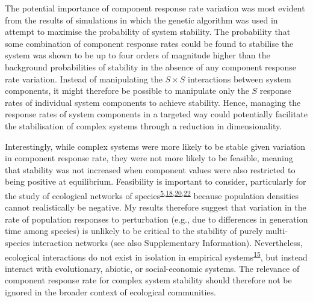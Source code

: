 \documentclass[]{article}
\begin{document}
The potential importance of component response rate variation was most
evident from the results of simulations in which the genetic algorithm
was used in attempt to maximise the probability of system stability. The
probability that some combination of component response rates could be
found to stabilise the system was shown to be up to four orders of
magnitude higher than the background probabilities of stability in the
absence of any component response rate variation. Instead of
manipulating the \(S \times S\) interactions between system components,
it might therefore be possible to manipulate only the \(S\) response
rates of individual system components to achieve stability. Hence,
managing the response rates of system components in a targeted way could
potentially facilitate the stabilisation of complex systems through a
reduction in dimensionality.

Interestingly, while complex systems were more likely to be stable given
variation in component response rate, they were not more likely to be
feasible, meaning that stability was not increased when component values
were also restricted to being positive at equilibrium. Feasibility is
important to consider, particularly for the study of ecological networks
of
species\textsuperscript{\protect\hyperlink{ref-Grilli2017}{5},\protect\hyperlink{ref-Stone2017}{18},\protect\hyperlink{ref-Dougoud2018}{20},\protect\hyperlink{ref-Servan2018}{22}}
because population densities cannot realistically be negative. My
results therefore suggest that variation in the rate of population
responses to perturbation (e.g., due to differences in generation time
among species) is unlikely to be critical to the stability of purely
multi-species interaction networks (see also Supplementary Information).
Nevertheless, ecological interactions do not exist in isolation in
empirical
systems\textsuperscript{\protect\hyperlink{ref-Patel2018}{15}}, but
instead interact with evolutionary, abiotic, or social-economic systems.
The relevance of component response rate for complex system stability
should therefore not be ignored in the broader context of ecological
communities.
\end{document}
